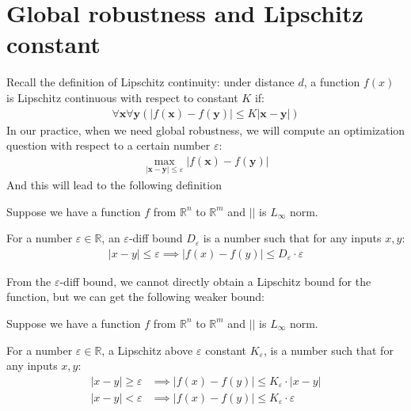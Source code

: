      
	
	
	
	\iffalse
	
	\section{Global robustness and Lipschitz constant}
	
	
	Recall the definition of Lipschitz continuity:
	under distance $d$, a function $f(x)$ is Lipschitz continuous with respect to constant $K$ if:
	\begin{align*}
		\forall \boldsymbol{x} \forall\boldsymbol{y} (|f(\boldsymbol{x}) -f(\boldsymbol{y}) |\leq K|\boldsymbol{x}-\boldsymbol{y}|)
	\end{align*} 
	In our practice, when we need global robustness, we will compute an optimization question with respect to a certain number $\varepsilon$:	\begin{align}\label{global_robustness}
		\max_{|\boldsymbol{x}-\boldsymbol{y}| \leq \varepsilon} |f(\boldsymbol{x}) -f(\boldsymbol{y}) |
	\end{align} And this will lead to the following definition
	
	\begin{definition}
		Suppose we have a function $f$ from $\mathbb{R}^n$ to $\mathbb{R}^m$ and $||$ is $L_\infty$ norm. 
		
		For a number $\varepsilon\in\mathbb{R}$, an $\varepsilon$-diff bound $D_\varepsilon$ is a number such that for any inputs $x,y$: \begin{align*}
			|x-y|\leq \varepsilon \implies |f(x)-f(y)| \leq D_\varepsilon \cdot \varepsilon
		\end{align*}
		
	\end{definition}
	
	From the $\varepsilon$-diff bound, we cannot directly obtain a Lipschitz bound for the function, but we can get the following weaker bound:
	
	\begin{definition}
		Suppose we have a function $f$ from $\mathbb{R}^n$ to $\mathbb{R}^m$ and $||$ is $L_\infty$ norm. 
		
		For a number $\varepsilon\in\mathbb{R}$, a Lipschitz above $\varepsilon$ constant  $K_\varepsilon$,  is a number such that for any inputs $x,y$: \begin{align*}
			|x-y|\geq \varepsilon &\implies |f(x)-f(y)| \leq K_\varepsilon \cdot |x-y|\\
			|x-y|<\varepsilon &\implies |f(x)-f(y)| \leq K_\varepsilon \cdot \varepsilon\\
		\end{align*}		
	\end{definition}
	
